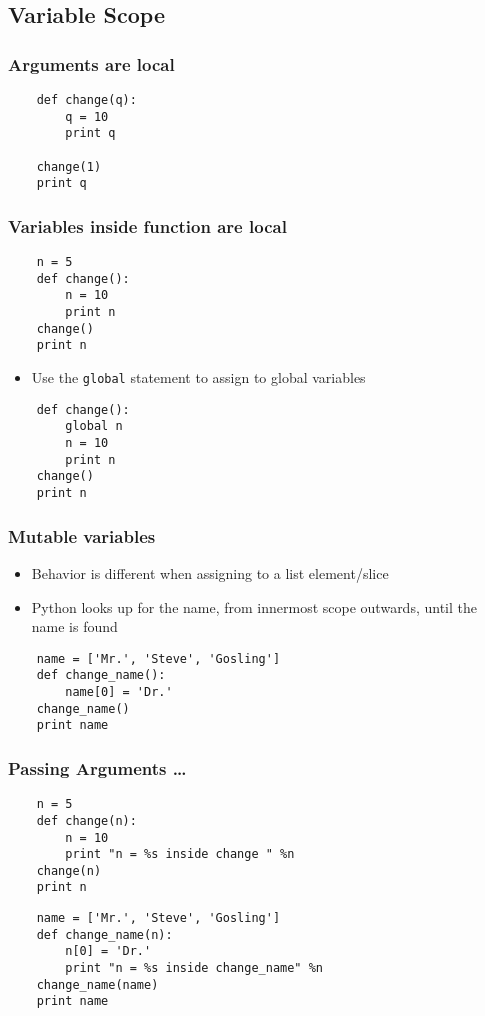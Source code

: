 \subsection*{Variable Scope}

\begin{frame}[fragile]
  \frametitle{Arguments are local}
  \begin{lstlisting}
    def change(q):
        q = 10
        print q

    change(1)
    print q
  \end{lstlisting}
\end{frame}

\begin{frame}[fragile]
  \frametitle{Variables inside function are local}
  \begin{lstlisting}
    n = 5
    def change():
        n = 10
        print n
    change()
    print n
  \end{lstlisting}
  \begin{itemize}
  \item Use the \texttt{global} statement to assign to global variables
  \end{itemize}
  \begin{lstlisting}
    def change():
        global n
        n = 10
        print n
    change()
    print n
  \end{lstlisting}
\end{frame}

\begin{frame}[fragile]
  \frametitle{Mutable variables}
  \begin{itemize}
  \item Behavior is different when assigning to a list element/slice
  \item Python looks up for the name, from innermost scope outwards,
    until the name is found
  \end{itemize}
  \begin{lstlisting}
    name = ['Mr.', 'Steve', 'Gosling']
    def change_name():
        name[0] = 'Dr.'
    change_name()
    print name
  \end{lstlisting}
\end{frame}

\begin{frame}[fragile]
  \frametitle{Passing Arguments \ldots}
  \begin{lstlisting}
    n = 5
    def change(n):
        n = 10
        print "n = %s inside change " %n
    change(n)
    print n
  \end{lstlisting}
  
  \begin{lstlisting}
    name = ['Mr.', 'Steve', 'Gosling']
    def change_name(n):
        n[0] = 'Dr.'
        print "n = %s inside change_name" %n
    change_name(name)
    print name
  \end{lstlisting}
\end{frame}
